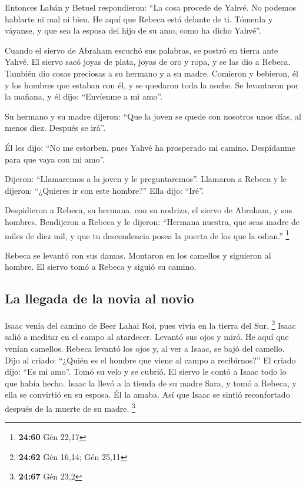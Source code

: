 \begin{paracol}{2}
 Entonces Labán y Betuel respondieron: ``La cosa procede
de Yahvé. No podemos hablarte ni mal ni bien.  He aquí
que Rebeca está delante de ti. Tómenla y váyanse, y que sea la esposa
del hijo de su amo, como ha dicho Yahvé''.

 Cuando el siervo de Abraham escuchó sus palabras, se
postró en tierra ante Yahvé.  El siervo sacó joyas de
plata, joyas de oro y ropa, y se las dio a Rebeca. También dio cosas
preciosas a su hermano y a su madre.  Comieron y
bebieron, él y los hombres que estaban con él, y se quedaron toda la
noche. Se levantaron por la mañana, y él dijo: ``Envíenme a mi amo''.

 Su hermano y su madre dijeron: ``Que la joven se quede
con nosotros unos días, al menos diez. Después se irá''.

 Él les dijo: ``No me estorben, pues Yahvé ha prosperado
mi camino. Despídanme para que vaya con mi amo''.

 Dijeron: ``Llamaremos a la joven y le preguntaremos''.
 Llamaron a Rebeca y le dijeron: ``¿Quieres ir con este
hombre?'' Ella dijo: ``Iré''.

 Despidieron a Rebeca, su hermana, con su nodriza, el
siervo de Abraham, y sus hombres.  Bendijeron a Rebeca y
le dijeron: ``Hermana nuestra, que seas madre de miles de diez mil, y
que tu descendencia posea la puerta de los que la odian.'' \footnote{\textbf{24:60}
  Gén 22,17}

 Rebeca se levantó con sus damas. Montaron en los
camellos y siguieron al hombre. El siervo tomó a Rebeca y siguió su
camino.

\hypertarget{la-llegada-de-la-novia-al-novio}{%
\subsection{La llegada de la novia al
novio}\label{la-llegada-de-la-novia-al-novio}}

 Isaac venía del camino de Beer Lahai Roi, pues vivía en
la tierra del Sur. \footnote{\textbf{24:62} Gén 16,14; Gén 25,11}
 Isaac salió a meditar en el campo al atardecer. Levantó
sus ojos y miró. He aquí que venían camellos.  Rebeca
levantó los ojos y, al ver a Isaac, se bajó del camello. 
Dijo al criado: ``¿Quién es el hombre que viene al campo a recibirnos?''
El criado dijo: ``Es mi amo''. Tomó su velo y se cubrió. 
El siervo le contó a Isaac todo lo que había hecho. 
Isaac la llevó a la tienda de su madre Sara, y tomó a Rebeca, y ella se
convirtió en su esposa. Él la amaba. Así que Isaac se sintió
reconfortado después de la muerte de su madre. \footnote{\textbf{24:67}
  Gén 23,2}


\end{paracol}
